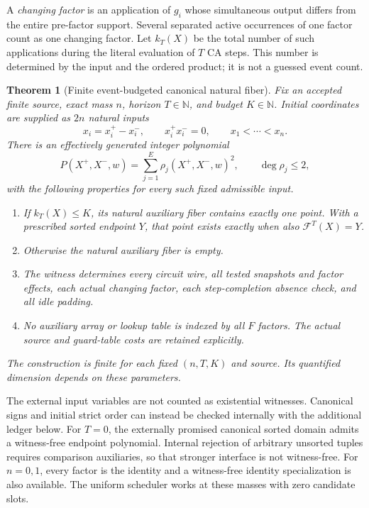 \documentclass[11pt,a4paper]{article}
\numberwithin{equation}{section}
\newtheorem{theorem}{Theorem}[section]
\newcommand{\N}{\mathbb N}\newcommand{\Z}{\mathbb Z}\newcommand{\R}{\mathbb R}
\newcommand{\CA}{\mathcal F}\newcommand{\tabsize}{S_{\rm tab}}\newcommand{\Dv}{D_{\rm v}}
\begin{document}
A \emph{changing factor} is an application of $g_i$ whose simultaneous output differs from the entire pre-factor support. Several separated active occurrences of one factor count as one changing factor. Let $k_T(X)$ be the total number of such applications during the literal evaluation of $T$ CA steps. This number is determined by the input and the ordered product; it is not a guessed event count.

\begin{theorem}[Finite event-budgeted canonical natural fiber]\label{fpa:eb:thm:main}
Fix an accepted finite source, exact mass $n$, horizon $T\in\N$, and budget $K\in\N$. Initial coordinates are supplied as $2n$ natural inputs
\[
x_i=x_i^+-x_i^-,\qquad x_i^+x_i^-=0,\qquad x_1<\cdots<x_n.
\]
There is an effectively generated integer polynomial
\[
P(X^+,X^-,w)=\sum_{j=1}^{E}\rho_j(X^+,X^-,w)^2,
\qquad \deg\rho_j\leq2,
\]
with the following properties for every such fixed admissible input.
\begin{enumerate}
\item If $k_T(X)\leq K$, its natural auxiliary fiber contains exactly one point. With a prescribed sorted endpoint $Y$, that point exists exactly when also $\CA^T(X)=Y$.
\item Otherwise the natural auxiliary fiber is empty.
\item The witness determines every circuit wire, all tested snapshots and factor effects, each actual changing factor, each step-completion absence check, and all idle padding.
\item No auxiliary array or lookup table is indexed by all $F$ factors. The actual source and guard-table costs are retained explicitly.
\end{enumerate}
The construction is finite for each fixed $(n,T,K)$ and source. Its quantified dimension depends on these parameters.
\end{theorem}

The external input variables are not counted as existential witnesses. Canonical signs and initial strict order can instead be checked internally with the additional ledger below. For $T=0$, the externally promised canonical sorted domain admits a witness-free endpoint polynomial. Internal rejection of arbitrary unsorted tuples requires comparison auxiliaries, so that stronger interface is not witness-free. For $n=0,1$, every factor is the identity and a witness-free identity specialization is also available. The uniform scheduler works at these masses with zero candidate slots.
\end{document}
